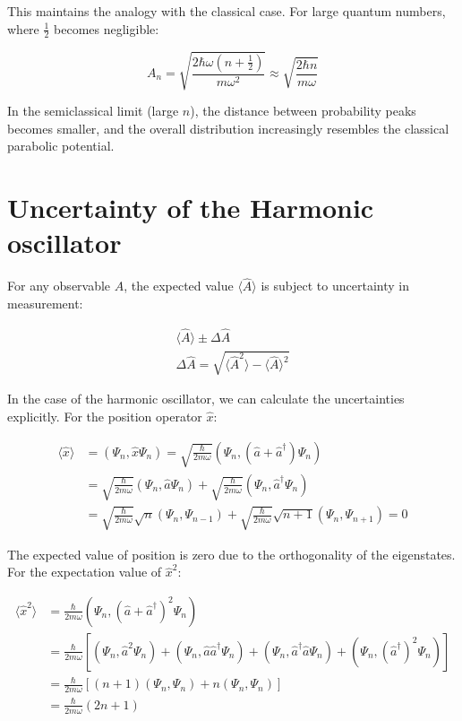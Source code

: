 This maintains the analogy with the classical case. For large quantum numbers, where $\frac{1}{2}$ becomes negligible:

\begin{equation}
A_n = \sqrt{\frac{2\hbar\omega(n+\frac{1}{2})}{m\omega^2}} \approx \sqrt{\frac{2\hbar n}{m\omega}}
\end{equation}

In the semiclassical limit (large $n$), the distance between probability peaks becomes smaller, and the overall distribution increasingly resembles the classical parabolic potential.

\section{Uncertainty of the Harmonic oscillator}

For any observable $\hat{A}$, the expected value $\langle\hat{A}\rangle$ is subject to uncertainty in measurement:

\begin{gather}
\langle\hat{A}\rangle \pm \Delta\hat{A}  \\
\Delta\hat{A} = \sqrt{\langle\hat{A}^2\rangle - \langle\hat{A}\rangle^2}
\end{gather}


In the case of the harmonic oscillator, we can calculate the uncertainties explicitly. For the position operator $\hat{x}$:

\begin{align}
\langle\hat{x}\rangle &= (\Psi_n, \hat{x}\Psi_n) = \sqrt{\frac{\hbar}{2m\omega}}(\Psi_n, (\hat{a}+\hat{a}^\dagger)\Psi_n) \\
&= \sqrt{\frac{\hbar}{2m\omega}}(\Psi_n, \hat{a}\Psi_n) + \sqrt{\frac{\hbar}{2m\omega}}(\Psi_n, \hat{a}^\dagger\Psi_n) \\
&= \sqrt{\frac{\hbar}{2m\omega}}\sqrt{n}(\Psi_n, \Psi_{n-1}) + \sqrt{\frac{\hbar}{2m\omega}}\sqrt{n+1}(\Psi_n, \Psi_{n+1}) = 0
\end{align}

The expected value of position is zero due to the orthogonality of the eigenstates. For the expectation value of $\hat{x}^2$:

\begin{align}
\langle\hat{x}^2\rangle &= \frac{\hbar}{2m\omega}(\Psi_n, (\hat{a}+\hat{a}^\dagger)^2\Psi_n) \\
&= \frac{\hbar}{2m\omega}[(\Psi_n, \hat{a}^2\Psi_n) + (\Psi_n, \hat{a}\hat{a}^\dagger\Psi_n) + (\Psi_n, \hat{a}^\dagger\hat{a}\Psi_n) + (\Psi_n, (\hat{a}^\dagger)^2\Psi_n)] \\
&= \frac{\hbar}{2m\omega}[(n+1)(\Psi_n, \Psi_n) + n(\Psi_n, \Psi_n)] \\
&= \frac{\hbar}{2m\omega}(2n+1)
\end{align}

